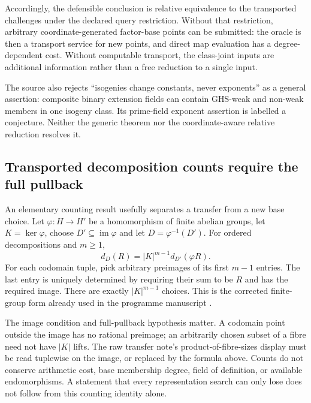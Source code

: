 Accordingly, the defensible conclusion is relative equivalence to the
transported challenges under the declared query restriction. Without
that restriction, arbitrary coordinate-generated factor-base points can
be submitted: the oracle is then a transport service for new points,
and direct map evaluation has a degree-dependent cost. Without
computable transport, the class-joint inputs are additional information
rather than a free reduction to a single input.

The source also rejects ``isogenies change constants, never exponents''
as a general assertion: composite binary extension fields can contain
GHS-weak and non-weak members in one isogeny class. Its prime-field
exponent assertion is labelled a conjecture. Neither the generic theorem
nor the coordinate-aware relative reduction resolves it.

\subsection{Transported decomposition counts require the full pullback}
An elementary counting result usefully separates a transfer from a new
base choice. Let $\varphi:H\to H'$ be a homomorphism of finite abelian
groups, let $K=\ker\varphi$, choose $D'\subseteq\operatorname{im}\varphi$
and let $D=\varphi^{-1}(D')$. For ordered decompositions and $m\geq1$,
\[
 d_D(R)=|K|^{m-1}d_{D'}(\varphi R).
\]
For each codomain tuple, pick arbitrary preimages of its first $m-1$
entries. The last entry is uniquely determined by requiring their sum
to be $R$ and has the required image. There are exactly $|K|^{m-1}$
choices. This is the corrected finite-group form already used in the
programme manuscript \cite{transferSource}.

The image condition and full-pullback hypothesis matter. A codomain
point outside the image has no rational preimage; an arbitrarily chosen
subset of a fibre need not have $|K|$ lifts. The raw transfer note's
product-of-fibre-sizes display must be read tuplewise on the image, or
replaced by the formula above. Counts do not conserve arithmetic cost,
base membership degree, field of definition, or available endomorphisms.
A statement that every representation search can only lose does not
follow from this counting identity alone.
